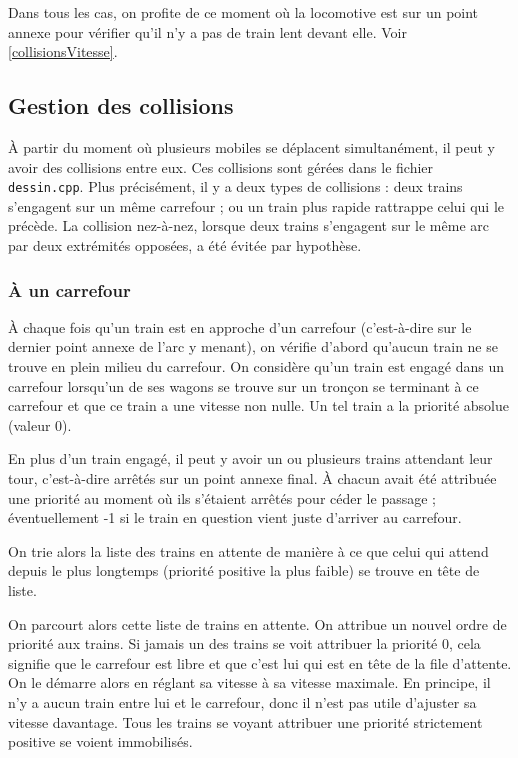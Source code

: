 \documentclass[a4paper, oneside, 11pt, twocolumn]{article}
\begin{document}
\bigskip

Dans tous les cas, on profite de ce moment où la locomotive est sur un point annexe pour vérifier qu'il n'y a pas de train lent devant elle. Voir \ref{collisionsVitesse}.

\subsection[Collisions]{Gestion des collisions}

À partir du moment où plusieurs mobiles se déplacent simultanément, il peut y avoir des collisions entre eux. Ces collisions sont gérées dans le fichier \texttt{dessin.cpp}. Plus précisément, il y a deux types de collisions : deux trains s'engagent sur un même carrefour ; ou un train plus rapide rattrappe celui qui le précède. La collision nez-à-nez, lorsque deux trains s'engagent sur le même arc par deux extrémités opposées, a été évitée par hypothèse.

\subsubsection{À un carrefour}
\label{collisionsCarrefour}

À chaque fois qu'un train est en approche d'un carrefour (c'est-à-dire sur le dernier point annexe de l'arc y menant), on vérifie d'abord qu'aucun train ne se trouve en plein milieu du carrefour. On considère qu'un train est engagé dans un carrefour lorsqu'un de ses wagons se trouve sur un tronçon se terminant à ce carrefour et que ce train a une vitesse non nulle. Un tel train a la priorité absolue (valeur 0).

En plus d'un train engagé, il peut y avoir un ou plusieurs trains attendant leur tour, c'est-à-dire arrêtés sur un point annexe final. À chacun avait été attribuée une priorité au moment où ils s'étaient arrêtés pour céder le passage ; éventuellement -1 si le train en question vient juste d'arriver au carrefour.

On trie alors la liste des trains en attente de manière à ce que celui qui attend depuis le plus longtemps (priorité positive la plus faible) se trouve en tête de liste.

On parcourt alors cette liste de trains en attente. On attribue un nouvel ordre de priorité aux trains. Si jamais un des trains se voit attribuer la priorité 0, cela signifie que le carrefour est libre et que c'est lui qui est en tête de la file d'attente. On le démarre alors en réglant sa vitesse à sa vitesse maximale. En principe, il n'y a aucun train entre lui et le carrefour, donc il n'est pas utile d'ajuster sa vitesse davantage. Tous les trains se voyant attribuer une priorité strictement positive se voient immobilisés.
\end{document}
